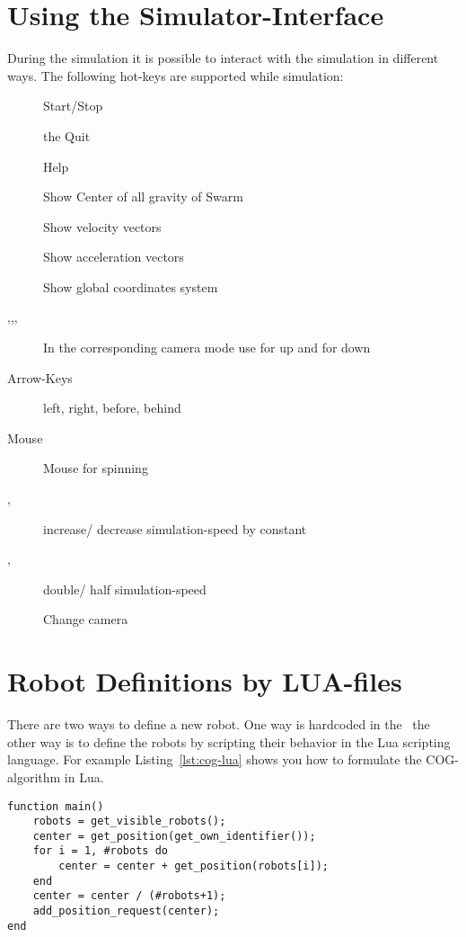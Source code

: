 \documentclass[a4paper,halfparskip,11pt,twoside]{scrartcl}
\begin{document}
\section{Using the Simulator-Interface}
During the simulation it is possible to interact with the simulation in different ways. The following hot-keys are supported while simulation:

\begin{description}
	\item [] Start/Stop
	\item [] the Quit \RSS\
	\item [] Help
	\item [] Show Center of all gravity of Swarm
	\item [] Show velocity vectors
	\item [] Show acceleration vectors
	\item [] Show global coordinates system
	\item [,,,] In the corresponding camera mode use  for up  and  for down %
	\item [Arrow-Keys] left, right, before, behind
	\item [Mouse] Mouse for spinning
	\item [\fbox{\tt +}, \fbox{\tt -}] increase/ decrease simulation-speed by constant
	\item [\fbox{\tt *},\fbox{\tt /}] double/ half simulation-speed
	\item [] Change camera
\end{description}

\section{Robot Definitions by LUA-files}
There are two ways to define a new robot. One way is hardcoded in the \RSS\, the other way is to define the robots by scripting their behavior in the {\sffamily Lua} scripting language. For example Listing~\ref{lst:cog-lua} shows you how to formulate the COG-algorithm in Lua.


\lstset{language=c}
\begin{lstlisting}[caption={COG algorithm in Lua},label=lst:cog-lua]
function main() 
    robots = get_visible_robots();
    center = get_position(get_own_identifier());
    for i = 1, #robots do
        center = center + get_position(robots[i]);
    end
    center = center / (#robots+1);
    add_position_request(center);
end
\end{lstlisting}
\end{document}
